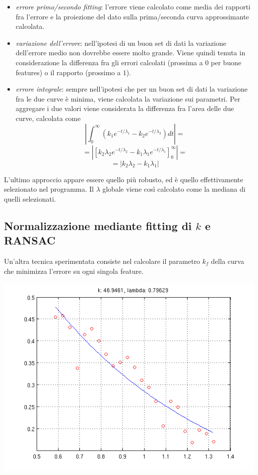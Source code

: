 \documentclass[12pt]{report}
\begin{document}
\begin{itemize}
	\item	\emph{errore primo/secondo fitting}: l'errore viene calcolato come media dei rapporti fra l'errore e la proiezione del dato sulla prima/seconda curva approssimante calcolata.
	\item	\emph{variazione dell'errore}: nell'ipotesi di un buon set di dati la variazione dell'errore medio non dovrebbe essere molto grande. Viene quindi tenuta in considerazione la differenza fra gli errori calcolati (prossima a $0$ per buone features) o il rapporto (prossimo a $1$).
	\item	\emph{errore integrale}: sempre nell'ipotesi che per un buon set di dati la variazione fra le due curve \`e minima, viene calcolata la variazione sui parametri. Per aggregare i due valori viene considerata la differenza fra l'area delle due curve, calcolata come $$\left|\int^{\infty}_0\left(k_1e^{-t/\lambda_1} - k_2e^{-t/\lambda_2}\right)dt\right| =$$ $$= \left|\left[ k_2\lambda_2e^{-t/\lambda_2} - k_1\lambda_1e^{-t/\lambda_1} \right]^\infty_0\right| =$$ $$ = \left|k_2\lambda_2 - k_1\lambda_1\right|$$
\end{itemize}

\noindent L'ultimo approccio appare essere quello pi\`u robusto, ed \`e quello effettivamente selezionato nel programma. Il $\lambda$ globale viene cos\`i calcolato come la mediana di quelli selezionati.

\subsection{Normalizzazione mediante fitting di $k$ e RANSAC}

\noindent Un'altra tecnica sperimentata consiste nel calcolare il parametro $k_f$ della curva che minimizza l'errore su ogni singola feature.\\

\begin{center}
	\includegraphics[scale=0.75]{images/fitting.png}
	\label{fig:fitting}
\end{center}
\end{document}
